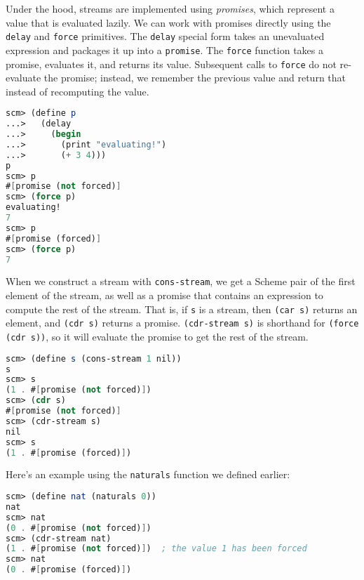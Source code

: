 Under the hood, streams are implemented using \textit{promises}, which represent
a value that is evaluated lazily. We can work with promises directly using the
\texttt{delay} and \texttt{force} primitives. The \texttt{delay} special form
takes an unevaluated expression and packages it up into a \texttt{promise}. The
\texttt{force} function takes a promise, evaluates it, and returns its value.
Subsequent calls to \texttt{force} do not re-evaluate the promise; instead, we
remember the previous value and return that instead of recomputing the value.

\begin{lstlisting}[language=Scheme]
scm> (define p
...>   (delay
...>     (begin
...>       (print "evaluating!")
...>       (+ 3 4)))
p
scm> p
#[promise (not forced)]
scm> (force p)
evaluating!
7
scm> p
#[promise (forced)]
scm> (force p)
7
\end{lstlisting}

When we construct a stream with \texttt{cons-stream}, we get a Scheme pair of
the first element of the stream, as well as a promise that contains an
expression to compute the rest of the stream. That is, if \texttt{s} is a
stream, then \texttt{(car s)} returns an element, and \texttt{(cdr s)} returns
a promise. \texttt{(cdr-stream s)} is shorthand for \texttt{(force (cdr s))},
so it will evaluate the promise to get the rest of the stream.

\begin{lstlisting}[language=Scheme]
scm> (define s (cons-stream 1 nil))
s
scm> s
(1 . #[promise (not forced)])
scm> (cdr s)
#[promise (not forced)]
scm> (cdr-stream s)
nil
scm> s
(1 . #[promise (forced)])
\end{lstlisting}

Here's an example using the \texttt{naturals} function we defined earlier:

\begin{lstlisting}[language=Scheme]
scm> (define nat (naturals 0))
nat
scm> nat
(0 . #[promise (not forced)])
scm> (cdr-stream nat)
(1 . #[promise (not forced)])  ; the value 1 has been forced
scm> nat
(0 . #[promise (forced)])
\end{lstlisting}
